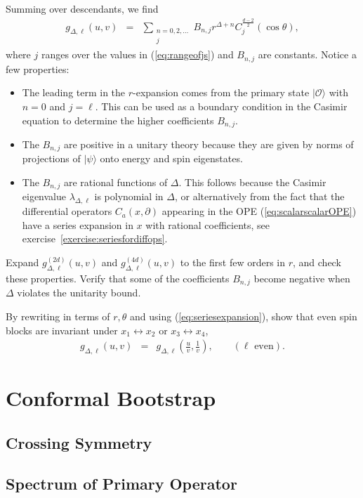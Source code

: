\documentclass[12pt]{article}
\numberwithin{equation}{section}
\newcommand\be{\begin{eqnarray}}
\newcommand\ee{\end{eqnarray}}
\newcommand\cO{\mathcal{O}}
\newcommand\p[1]{\left(#1\right)}
\newcommand\ptl\partial
\newcommand\<\langle
\renewcommand\>\rangle
\renewcommand\.{\cdot}
\newcommand\De{\Delta}
\renewcommand\l\lambda
\renewcommand\th{\theta}
\begin{document}
Summing over descendants, we find
\be
\label{eq:seriesexpansion}
g_{\De,\ell}(u,v) &=& \sum_{\substack{n=0,2,\dots \\ j}} B_{n,j}r^{\De+n}C_j^{\frac{d-2}{2}}(\cos\th),\label{eq:seriesforblock}
\ee
where $j$ ranges over the values in (\ref{eq:rangeofjs}) and $B_{n,j}$ are constants.  
Notice a few properties:
\begin{itemize}
\item The leading term in the $r$-expansion comes from the primary state $|\cO\>$ with $n=0$ and $j=\ell$. This can be used as a boundary condition in the Casimir equation to determine the higher coefficients $B_{n,j}$.
\item The $B_{n,j}$ are positive in a unitary theory because they are given by norms of projections of $|\psi\>$ onto energy and spin eigenstates.
\item The $B_{n,j}$ are rational functions of $\De$.  This follows because the Casimir eigenvalue $\l_{\De,\ell}$ is polynomial in $\De$, or alternatively from the fact that the differential operators $C_a(x,\ptl)$ appearing in the OPE (\ref{eq:scalarscalarOPE}) have a series expansion in $x$ with rational coefficients, see exercise~\ref{exercise:seriesfordiffops}. 
\end{itemize}

Expand $g^{(2d)}_{\De,\ell}(u,v)$ and $g^{(4d)}_{\De,\ell}(u,v)$ to the first few orders in $r$, and check these properties.  Verify that some of the coefficients $B_{n,j}$ become negative when $\De$ violates the unitarity bound.

By rewriting in terms of $r,\th$ and using (\ref{eq:seriesexpansion}), show that even spin blocks are invariant under $x_1\leftrightarrow x_2$ or $x_3\leftrightarrow x_4$,
\be
\label{eq:invariantunderonetwo}
g_{\De,\ell}(u,v) &=& g_{\De,\ell}\p{\frac{u}{v},\frac 1 v},\qquad(\textrm{$\ell$ even}).
\ee

\section{Conformal Bootstrap}
\subsection{Crossing Symmetry}
\subsection{Spectrum of Primary Operator}
\end{document}
